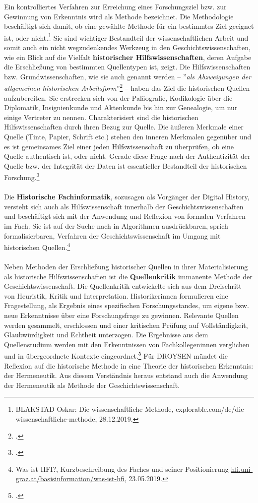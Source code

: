 \documentclass[12pt,a4paper]{article}
\begin{document}
Ein kontrolliertes Verfahren zur Erreichung eines Forschungsziel bzw. zur Gewinnung von Erkenntnis wird als Methode bezeichnet. Die Methodologie beschäftigt sich damit, ob eine gewählte Methode für ein bestimmtes Ziel geeignet ist, oder nicht.\footnote{BLAKSTAD Oskar: Die wissenschaftliche Methode, explorable.com/de/die-wissenschaftliche-methode, 28.12.2019.} Sie sind wichtiger Bestandteil der wissenschaftlichen Arbeit und somit auch ein nicht wegzudenkendes Werkzeug in den Geschichtswissenschaften, wie ein Blick auf die Vielfalt \textbf{historischer Hilfswissenschaften}, deren Aufgabe die Erschließung von bestimmten Quellentypen ist, zeigt. Die Hilfswissenschaften bzw. Grundwissenschaften, wie sie auch genannt werden -- ''\textit{als Abzweigungen der allgemeinen historischen Arbeitsform}''\footcite[][S.10]{von2007werkzeug} -- haben das Ziel die historischen Quellen aufzubereiten. Sie erstrecken sich von der Paläografie, Kodikologie über die Diplomatik, Insignienkunde und Aktenkunde bis hin zur Genealogie, um nur einige Vertreter zu nennen. Charakterisiert sind die historischen Hilfswissenschaften durch ihren Bezug zur Quelle. Die äußeren Merkmale einer Quelle (Tinte, Papier, Schrift etc.) stehen den inneren Merkmalen gegenüber und es ist gemeinsames Ziel einer jeden Hilfswissenschaft zu überprüfen, ob eine Quelle authentisch ist, oder nicht. Gerade diese Frage nach der Authentizität der Quelle bzw. der Integrität der Daten ist essentieller Bestandteil der historischen Forschung.\footcite[][S.7]{fickers2020update}
\\
\\
Die \textbf{Historische Fachinformatik}, sozusagen als Vorgänger der Digital History, versteht sich auch als Hilfswissenschaft innerhalb der Geschichtswissenschaften und beschäftigt sich mit der Anwendung und Reflexion von formalen Verfahren im Fach. Sie ist auf der Suche nach in Algorithmen ausdrückbaren, sprich formalisierbaren, Verfahren der Geschichtswissenschaft im Umgang mit historischen Quellen.\footnote{Was ist HFI?, Kurzbeschreibung des Faches und seiner Positionierung \protect\url{hfi.uni-graz.at/basisinformation/was-ist-hfi}, 23.05.2019.} 
\\
\\
Neben Methoden der Erschließung historischer Quellen in ihrer Materialisierung als historische Hilfswissenschaften ist die \textbf{Quellenkritik} immanente Methode der Geschichtswissenschaft. Die Quellenkritik entwickelte sich aus dem Dreischritt von Heuristik, Kritik und Interpretation. Historikerinnen formulieren eine Fragestellung, als Ergebnis eines spezifischen Forschungsstandes, um eigene bzw. neue Erkenntnisse über eine Forschungsfrage zu gewinnen. Relevante Quellen werden gesammelt, erschlossen und einer kritischen Prüfung auf Vollständigkeit, Glaubwürdigkeit und Echtheit unterzogen. Die Ergebnisse aus dem Quellenstudium werden mit den Erkenntnissen von Fachkollegeninnen verglichen und in übergeordnete Kontexte eingeordnet.\footcite[][S.43-45]{jordan2018theorien} Für DROYSEN mündet die Reflexion auf die historische Methode in eine Theorie der historischen Erkenntnis: der Hermeneutik. Aus diesem Verständnis heraus entstand auch die Anwendung der Hermeneutik als Methode der Geschichtswissenschaft.
\end{document}
